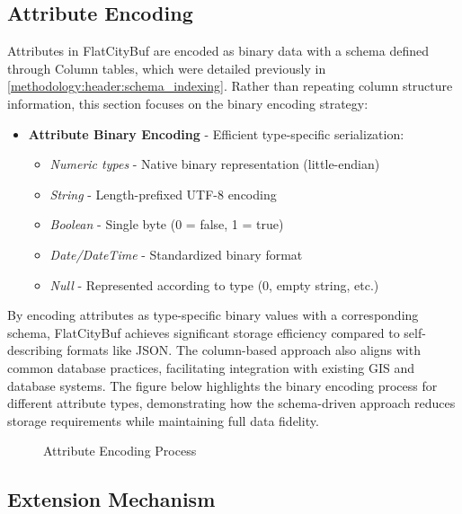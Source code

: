 \subsection{Attribute Encoding}
\label{methodology:feature_encoding:attribute_encoding}

Attributes in FlatCityBuf are encoded as binary data with a schema defined through Column tables, which were detailed previously in \autoref{methodology:header:schema_indexing}. Rather than repeating column structure information, this section focuses on the binary encoding strategy:

\begin{itemize}
  \item \textbf{Attribute Binary Encoding} - Efficient type-specific serialization:
    \begin{itemize}
      \item \textit{Numeric types} - Native binary representation (little-endian)
      \item \textit{String} - Length-prefixed UTF-8 encoding
      \item \textit{Boolean} - Single byte (0 = false, 1 = true)
      \item \textit{Date/DateTime} - Standardized binary format
      \item \textit{Null} - Represented according to type (0, empty string, etc.)
    \end{itemize}
\end{itemize}

By encoding attributes as type-specific binary values with a corresponding schema, FlatCityBuf achieves significant storage efficiency compared to self-describing formats like JSON. The column-based approach also aligns with common database practices, facilitating integration with existing GIS and database systems. The figure below highlights the binary encoding process for different attribute types, demonstrating how the schema-driven approach reduces storage requirements while maintaining full data fidelity.

\begin{figure}[h]
  \centering
  \caption{Attribute Encoding Process}
  \label{methodology:feature_encoding:attribute_encoding:figure}
\end{figure}

\subsection{Extension Mechanism}
\label{methodology:feature_encoding:extension_mechanism}

